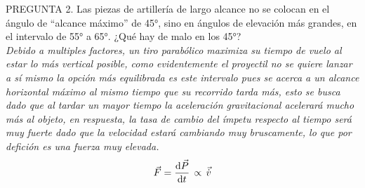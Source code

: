 \documentclass{article}
\begin{document}
PREGUNTA 2. Las piezas de artillería de largo alcance no se colocan en el ángulo de “alcance máximo” de 45°, sino en ángulos de elevación más grandes, en el intervalo de 55° a 65°. ¿Qué hay de malo en los 45°? \\
\textit{Debido a multiples factores, un tiro parabólico maximiza su tiempo de vuelo al estar lo más vertical posible, como evidentemente el proyectil no se quiere lanzar a sí mismo la opción más equilibrada es este intervalo pues se acerca a un alcance horizontal máximo al mismo tiempo que su recorrido tarda más, esto se busca dado que al tardar un mayor tiempo la aceleración gravitacional acelerará mucho más al objeto, en respuesta, la tasa de cambio del ímpetu respecto al tiempo será muy fuerte dado que la velocidad estará cambiando muy bruscamente, lo que por defición es una fuerza muy elevada.}
\begin{equation}
\Vec{F} = \dv{\Vec{P}}{t} \, \propto \, \Vec{\dot{v}}
\end{equation}
\\
\end{document}
